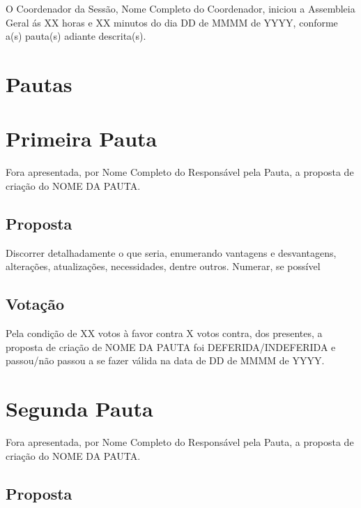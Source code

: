 \documentclass[12pt]{article}
\begin{document}
\dividerline

\tableofcontents

\hbox{}
\dividerline



O Coordenador da Sessão, Nome Completo do Coordenador,  iniciou a Assembleia Geral ás XX horas e XX minutos do dia DD de MMMM de YYYY, conforme a(s) pauta(s) adiante descrita(s).

\section*{Pautas}

\section{Primeira Pauta}

Fora apresentada, por Nome Completo do Responsável pela Pauta, a proposta de criação do NOME DA PAUTA.

\subsection*{Proposta}

Discorrer detalhadamente o que seria, enumerando vantagens e desvantagens, alterações, atualizações, necessidades, dentre outros. 
Numerar, se possível

\subsection*{Votação}

Pela condição de XX votos à favor contra X votos contra, dos presentes, a proposta de criação de NOME DA PAUTA foi DEFERIDA/INDEFERIDA e passou/não passou a se fazer válida na data de DD de MMMM de YYYY.

\section{Segunda Pauta}

Fora apresentada, por Nome Completo do Responsável pela Pauta, a proposta de criação do NOME DA PAUTA.

\subsection*{Proposta}
\end{document}
